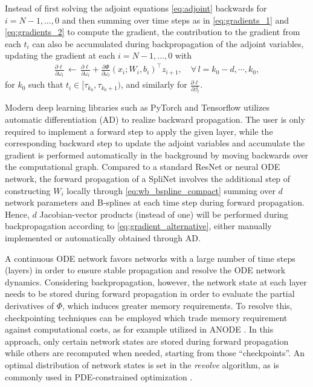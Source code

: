 \documentclass[12pt]{amsart}
\begin{document}
    Instead of first solving the adjoint equations \eqref{eq:adjoint} backwards for $i=N-1, \dots, 0$ and then summing over time steps as in \eqref{eq:gradients_1} and \eqref{eq:gradients_2} to compute the gradient, the contribution to the gradient from each $t_i$ can also be accumulated during backpropagation of the adjoint variables, updating the gradient at each $i=N-1, \dots, 0$ with
    \begin{align}
    \label{eq:gradient_alternative}
        \frac{\partial \ell}{\partial \omega_l} \, \longleftarrow \, \frac{\partial \ell}{\partial \omega_l} + \frac{\partial \Phi}{\partial \omega_l}(x_i;W_i,b_i)^\intercal z_{i+1}, \quad   \forall \, l = k_0-d,
        \cdots,k_0,
    \end{align}
    for $k_0$ such that $t_i \in [\tau_{k_0},\tau_{k_0+1})$, and similarly for $\frac{\partial \ell}{\partial \beta_l}$.

    Modern deep learning libraries such as PyTorch and Tensorflow utilizes automatic differentiation (AD) to realize backward propagation. The user is only required to implement a forward step to apply the given layer, while the corresponding backward step to update the adjoint variables and accumulate the gradient is performed automatically in the background by moving backwards over the computational graph.
    Compared to a standard ResNet or neural ODE network, the forward propagation of a SpliNet involves the additional step of constructing $W_i$ locally through \eqref{eq:wb_bspline_compact} summing over $d$ network parameters and B-splines at each time step during forward propagation. Hence, $d$ Jacobian-vector products (instead of one) will be performed during backpropagation according to \eqref{eq:gradient_alternative}, either manually implemented or automatically obtained through AD.

    A continuous ODE network favors networks with a large number of time steps (layers) in order to ensure stable propagation and resolve the ODE network dynamics.
    Considering backpropagation, however, the network state at each layer needs to be stored during forward propagation in order to evaluate the partial derivatives of $\Phi$, which induces greater memory requirements.
    To resolve this, checkpointing techniques can be employed which trade memory requirement against computational costs, as for example utilized in ANODE \cite{gholami2019anode}. In this approach, only certain network states are stored during forward propagation while others are recomputed when needed, starting from those ``checkpoints''. An optimal distribution of network states is set in the \textit{revolve} algorithm, as is commonly used in PDE-constrained optimization \cite{griewank2000algorithm}.
\end{document}
